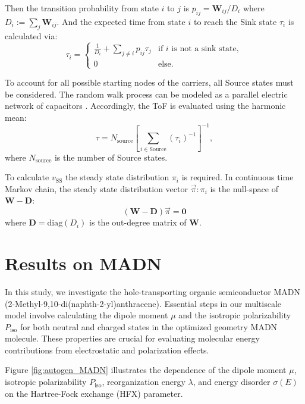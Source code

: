 \documentclass[letterpaper,12pt]{article}
\begin{document}
Then the transition probability from state $i$ to $j$ is $p_{ij} = \mathbf{W}_{ij}/D_i$ where $D_i := \sum_{j} \mathbf{W}_{ij}$.
And the expected time from state $i$ to reach the Sink state $\tau_i$ is calculated via: 
\begin{equation}\label{eq:hitting_time}
	\tau_i = \begin{cases}
		\frac{1}{D_i} + \sum_{j \ne i} p_{ij} \tau_{j} &\text{if $i$ is not a sink state},\\
		0 &\text{else.} 
	\end{cases}
\end{equation} 

To account for all possible starting nodes of the carriers, all Source states must be considered. The random walk process can be modeled as a parallel electric network of capacitors \cite{doyle_random_2000}. Accordingly, the ToF is evaluated using the harmonic mean:
\begin{equation} 
\tau = N_\text{source} \left[\sum_{i \in \text{Source}} (\tau_i)^{-1}\right]^{-1},
\label{eq:ToF}
\end{equation}
where $N_\text{source}$ is the number of Source states.

To calculate $v_\text{SS}$ the steady state distribution $\pi_i$ is required. In continuous time Markov chain, the steady state distribution vector $\vec{\pi}: \pi_i$ is the null-space of $\mathbf{W}-\mathbf{D}$:
\begin{equation}
    (\mathbf{W}-\mathbf{D} )\vec{\pi} = \mathbf{0}
\end{equation}
where $\mathbf{D} = \text{diag}(D_i)$ is the out-degree matrix of $\mathbf{W}$.

\section{Results on MADN}

In this study, we investigate the hole-transporting organic semiconductor MADN (2-Methyl-9,10-di(naphth-2-yl)anthracene). Essential steps in our multiscale model involve calculating the dipole moment $\mu$ and the isotropic polarizability $P_\text{iso}$ for both neutral and charged states in the optimized geometry MADN molecule. These properties are crucial for evaluating molecular energy contributions from electrostatic and polarization effects.

Figure \ref{fig:autogen_MADN} illustrates the dependence of the dipole moment $\mu$, isotropic polarizability $P_\text{iso}$, reorganization energy $\lambda$, and energy disorder $\sigma(E)$ on the Hartree-Fock exchange (HFX) parameter.
\end{document}

